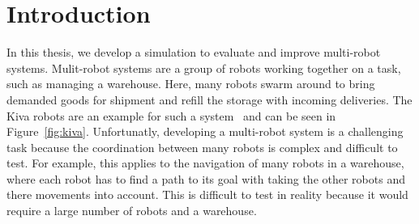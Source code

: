 \chapter{Introduction}

In this thesis, we develop a simulation to evaluate and improve multi-robot systems. Mulit-robot systems are a group of robots working together on a task, such as managing a warehouse. Here, many robots swarm around to bring demanded goods for shipment and refill the storage with incoming deliveries. The Kiva robots are an example for such a system~\cite{Kiva} and can be seen in Figure~\ref{fig:kiva}. Unfortunatly, developing a multi-robot system is a challenging task because the coordination between many robots is complex and difficult to test. For example, this applies to the navigation of many robots in a warehouse, where each robot has to find a path to its goal with taking the other robots and there movements into account. This is difficult to test in reality because it would require a large number of robots and a warehouse.

